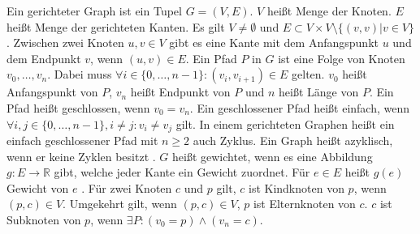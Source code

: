 \begin{definition}
    Ein gerichteter Graph ist ein Tupel $G=(V,E)$. $V$ heißt Menge der Knoten.
    $E$ heißt Menge der gerichteten Kanten. Es gilt $V\ne\emptyset$ und $E \subset V \times
    V \setminus \{(v,v) | v \in V\}$. Zwischen zwei Knoten $u,v \in V$ gibt es
    eine Kante mit dem Anfangspunkt $u$ und dem Endpunkt $v$, wenn $(u,v) \in E$.
    Ein Pfad $P$ in $G$  ist eine Folge von Knoten $v_0, \dots ,v_n$. Dabei
    muss $\forall i \in \{0, \dots, n-1 \} : (v_i,v_{i+1}) \in E$ gelten. $v_0$
    heißt Anfangspunkt von $P$, $v_n$ heißt Endpunkt von $P$ und $n$ heißt
    Länge von $P$. Ein Pfad heißt geschlossen, wenn $v_0 = v_n$. Ein
    geschlossener Pfad heißt einfach, wenn $\forall i,j \in \{0,\dots,n-1\}, i
    \ne j:v_i \ne v_j$ gilt. In einem gerichteten Graphen heißt ein einfach
    geschlossener Pfad mit $n\geq 2$ auch Zyklus. Ein Graph heißt azyklisch,
    wenn er keine Zyklen besitzt \autocite[Vgl.][S.221ff]{AlgorithmenUndDatenstrukturen}.
    $G$ heißt gewichtet, wenn es eine Abbildung $g:E\rightarrow \mathbb{R}$
    gibt, welche jeder Kante ein Gewicht zuordnet. Für $e\in E$ heißt $g(e)$
    Gewicht von $e$ \autocite[Vgl.][S.253]{AlgorithmenUndDatenstrukturen}.
    Für zwei Knoten $c$ und $p$ gilt, $c$ ist Kindknoten von $p$, wenn $(p,c)\in V$.
    Umgekehrt gilt, wenn $(p,c)\in V$, $p$ ist Elternknoten von $c$.
    $c$ ist Subknoten von $p$, wenn $\exists P: (v_0=p) \land (v_n=c)$.
    \label{def:graph}
\end{definition}

